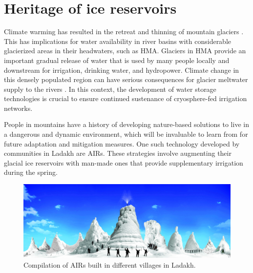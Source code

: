 \chapter{Heritage of ice reservoirs}


Climate warming has resulted in the retreat and thinning of mountain glaciers
\citep{ipccCrossChapterPaperMountains2022}. This has implications for water availability in river basins with considerable glacierized areas in their headwaters, such as \ac{HMA}. Glaciers in \ac{HMA} provide an important
gradual release of water that is used by many people locally and downstream for irrigation, drinking water, and
hydropower. Climate change in this densely populated region can have serious consequences for glacier meltwater
supply to the rivers \citep{immerzeelImportanceVulnerabilityWorld2020}. In this context, the development of
water storage technologies is crucial to ensure continued sustenance of cryosphere-fed irrigation networks.

People in mountains have a history of developing nature-based solutions to live in a dangerous and dynamic
environment, which will be invaluable to learn from for future adaptation and mitigation measures. One such
technology developed by communities in Ladakh are \ac{AIRs}. These strategies involve augmenting their glacial
ice reservoirs with man-made ones that provide supplementary irrigation during the spring.

\begin{figure}[htb]
	\includegraphics[width=\textwidth]{figs/AIRs_Ladakh}
	\caption{Compilation of AIRs built in different villages in Ladakh.}
	\label{fig:airs_ladakh}
\end{figure}

